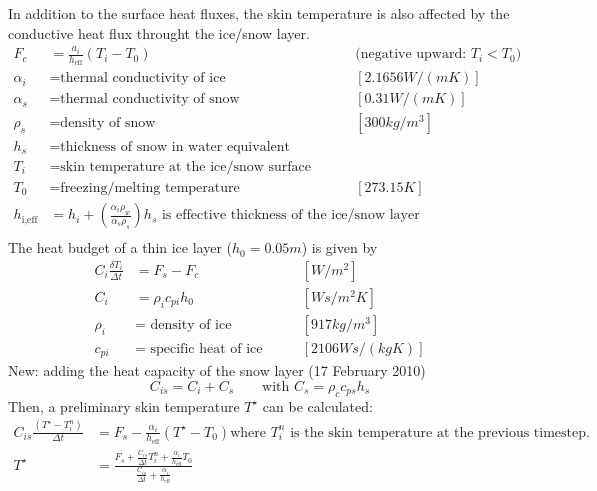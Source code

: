 \noindent In addition to the surface heat fluxes, the skin temperature is also affected by the conductive
heat flux throught the ice/snow layer.
\begin{align*}
F_c & =\frac{a_i}{h_{\text{eff}}} \left ( T_i - T_0 \right ) \qquad & \text{(negative upward: } T_i<T_0 \text{)} \\
\alpha_i & = \text{thermal conductivity of ice}  \qquad &  [ 2.1656 W/(mK) ] \\
\alpha_s & = \text{thermal conductivity of snow} \qquad & [ 0.31 W/(mK) ] \\
\rho_s & = \text{density of snow}     \qquad &           [ 300kg/m^3 ] \\
h_s &= \text{thickness of snow in water equivalent} \\
T_i &= \text{skin temperature at the ice/snow surface} \\
T_0 &= \text{freezing/melting temperature} \qquad & [273.15 K]\\
h_{\text{i,eff}} & = h_i+\left (\frac {\alpha_i \rho_w}{\alpha_s \rho_s}\right )h_s \text{ is effective thickness of the ice/snow layer} \\
\end{align*}
The heat budget of a thin ice layer ($h_0 = 0.05m$) is given by \\
\begin{align*}
C_i \frac{\delta T_i}{\Delta t}&=F_s -F_c \qquad & [W/m^2] \\
C_i &=\rho_i c_{pi} h_0  \qquad & [Ws /m^2K] \\
\rho_i &= \text{ density of ice} \qquad & [ 917 kg/m^3 ] \\
c_{pi} &= \text{ specific heat of ice} \qquad & [ 2106 Ws/(kgK) ]
\end{align*}
New: adding the heat capacity of the snow layer (17 February 2010)\\
\begin{equation*}
C_{is}=  C_i+C_s \qquad \text{with } C_s=\rho_c c_{ps} h_s
\end{equation*}
Then, a preliminary skin temperature $T^{\star}$ can be calculated: \\
\begin{align*}
C_{is}\frac{\left (T^{\star}-T_i^n \right )}{\Delta t}&=F_s - \frac{\alpha_i}{h_{\text{eff}}} \left (T^{\star}-T_0 \right ) \text{where } T_i^n \text{ is the skin temperature at the previous timestep.}\\
T^{\star}&=\frac{F_s+\frac{C_{is}} {\Delta t}T_i^n + \frac{\alpha_i}{h_{\text{eff}}} T_0}{\frac{C_{is}}{\Delta t}+\frac{\alpha_i}{h_{\text{eff}}}}
\end{align*}
